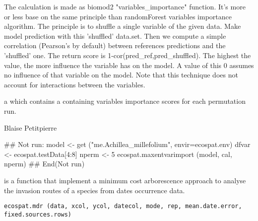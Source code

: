 \documentclass[a4paper]{book}
\begin{document}
%
\begin{Details}\relax
The calculation is made as biomod2 "variables\_importance" function. It's more or less base on the same principle than randomForest variables importance algorithm. The principle is to shuffle a single variable of the given data. Make model prediction with this 'shuffled' data.set. Then we compute a simple correlation (Pearson's by default) between references predictions and the 'shuffled' one. The return score is 1-cor(pred\_ref,pred\_shuffled). The highest the value, the more influence the variable has on the model. A value of this 0 assumes no influence of that variable on the model. Note that this technique does not account for interactions between the variables.
\end{Details}
%
\begin{Value}
a  which contains a  containing variables importance scores for each permutation run. 
\end{Value}
%
\begin{Author}\relax
Blaise Petitpierre 
\end{Author}
%
\begin{Examples}
\begin{ExampleCode}
## Not run: 
model <- get ("me.Achillea_millefolium", envir=ecospat.env)
dfvar <- ecospat.testData[4:8]
nperm <- 5
ecospat.maxentvarimport (model, cal, nperm)
## End(Not run)
\end{ExampleCode}
\end{Examples}
%
\begin{Description}\relax
{} is a function that implement a minimum cost arborescence approach to analyse the invasion routes of a species from dates occurrence data.
\end{Description}
%
\begin{Usage}
\begin{verbatim}
ecospat.mdr (data, xcol, ycol, datecol, mode, rep, mean.date.error, fixed.sources.rows)
\end{verbatim}
\end{Usage}
%
\end{document}
